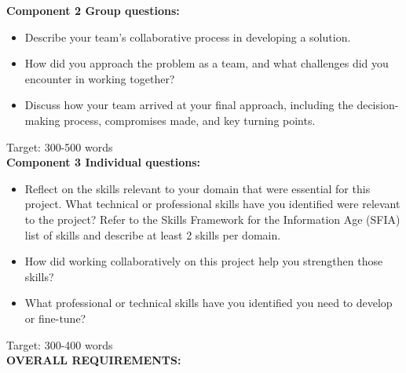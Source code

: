 \documentclass[a4paper, 11pt]{report}
\begin{document}
\textbf{Component 2 Group questions:}

\begin{itemize}
    \item Describe your team’s collaborative process in developing a solution.
    \item How did you approach the problem as a team, and what challenges did you encounter in working together? 
    \item Discuss how your team arrived at your final approach, including the decision-making process, compromises made, and key turning points. 
\end{itemize}
Target: 300-500 words \\[2mm]

\textbf{Component 3 Individual questions:}
\begin{itemize}
    \item Reflect on the skills relevant to your domain that were essential for this project. What technical or professional skills have you identified were relevant to the project? Refer to the Skills Framework for the Information Age (SFIA) list of skills \cite{sfia} and describe at least 2 skills per domain. 
    \item How did working collaboratively on this project help you strengthen those skills? 
    \item What professional or technical skills have you identified you need to develop or fine-tune?
\end{itemize}

Target: 300-400 words \\[2mm]


\textbf{OVERALL REQUIREMENTS:}
\end{document}
